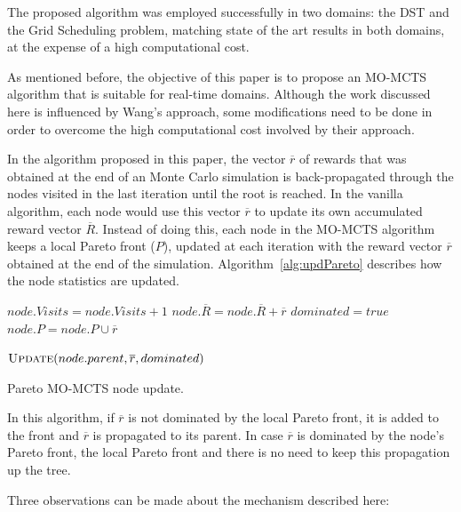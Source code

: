 \documentclass[journal]{IEEEtran}
\begin{document}
The proposed algorithm was employed successfully in two domains: the DST and the Grid Scheduling problem, matching state of the art results in both domains, at the expense of a high computational cost.

As mentioned before, the objective of this paper is to propose an MO-MCTS algorithm that is suitable for real-time domains. Although the work discussed here is influenced by Wang's approach, some modifications need to be done in order to overcome the high computational cost involved by their approach.

In the algorithm proposed in this paper, the vector $\overline{r}$ of rewards that was obtained at the end of an Monte Carlo simulation is back-propagated through the nodes visited in the last iteration until the root is reached. In the vanilla algorithm, each node would use this vector $\overline{r}$ to update its own accumulated reward vector $\overline{R}$. Instead of doing this, each node in the MO-MCTS algorithm keeps a local Pareto front ($P$), updated at each iteration with the reward vector $\overline{r}$ obtained at the end of the simulation. Algorithm~\ref{alg:updPareto} describes how the node statistics are updated.

\begin{algorithm}[!t]
\begin{algorithmic}[1]

	\State $node.Visits = node.Visits + 1$
	\State $node.\overline{R} = node.\overline{R} + \overline{r}$
			\State $dominated = true$
		\Else
			\State $node.P = node.P \cup \overline{r}$
		\EndIf
	\EndIf

	\State $\Call{Update}{node.parent,\overline{r},dominated}$
	
\EndFunction
\end{algorithmic}
\caption{Pareto MO-MCTS node update.}
\label{alg:updPareto}
\end{algorithm}

In this algorithm, if $\overline{r}$ is not dominated by the local Pareto front, it is added to the front and $\overline{r}$ is propagated to its parent. In case $\overline{r}$ is dominated by the node's Pareto front, the local Pareto front and there is no need to keep this propagation up the tree.

Three observations can be made about the mechanism described here:
\end{document}
